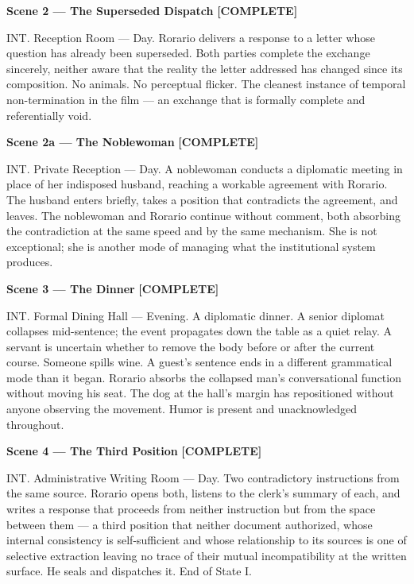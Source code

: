 \documentclass[12pt, oneside]{amsart}
\newcommand{\statuscomplete}{{\small\bfseries\color{complete}[COMPLETE]}}
\begin{document}
\bigskip

\noindent\textbf{Scene 2 — The Superseded Dispatch} \statuscomplete

\noindent INT. Reception Room --- Day. Rorario delivers a response to a letter whose question has already been superseded. Both parties complete the exchange sincerely, neither aware that the reality the letter addressed has changed since its composition. No animals. No perceptual flicker. The cleanest instance of temporal non-termination in the film --- an exchange that is formally complete and referentially void.

\bigskip

\noindent\textbf{Scene 2a --- The Noblewoman} \statuscomplete

\noindent INT. Private Reception --- Day. A noblewoman conducts a diplomatic meeting in place of her indisposed husband, reaching a workable agreement with Rorario. The husband enters briefly, takes a position that contradicts the agreement, and leaves. The noblewoman and Rorario continue without comment, both absorbing the contradiction at the same speed and by the same mechanism. She is not exceptional; she is another mode of managing what the institutional system produces.

\bigskip

\noindent\textbf{Scene 3 --- The Dinner} \statuscomplete

\noindent INT. Formal Dining Hall --- Evening. A diplomatic dinner. A senior diplomat collapses mid-sentence; the event propagates down the table as a quiet relay. A servant is uncertain whether to remove the body before or after the current course. Someone spills wine. A guest's sentence ends in a different grammatical mode than it began. Rorario absorbs the collapsed man's conversational function without moving his seat. The dog at the hall's margin has repositioned without anyone observing the movement. Humor is present and unacknowledged throughout.

\bigskip

\noindent\textbf{Scene 4 --- The Third Position} \statuscomplete

\noindent INT. Administrative Writing Room --- Day. Two contradictory instructions from the same source. Rorario opens both, listens to the clerk's summary of each, and writes a response that proceeds from neither instruction but from the space between them --- a third position that neither document authorized, whose internal consistency is self-sufficient and whose relationship to its sources is one of selective extraction leaving no trace of their mutual incompatibility at the written surface. He seals and dispatches it. End of State I.
\end{document}
